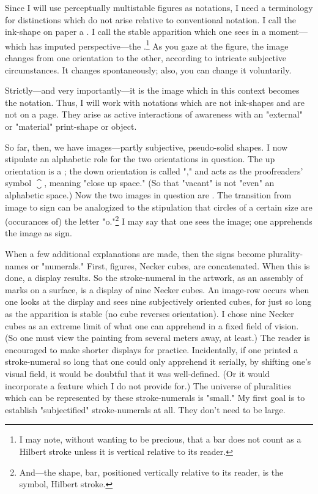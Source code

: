 Since I will use perceptually multistable figures as notations, I 
need a terminology for distinctions which do not arise relative to 
conventional notation. I call the ink-shape on paper a . I call the 
stable apparition which one sees in a moment---which has imputed 
perspective---the .\footnote{I may note, without wanting to be precious, that a bar does not count as a Hilbert stroke unless it is vertical relative to its reader.}
As you gaze at the figure, the image changes 
from one orientation to the other, according to intricate subjective 
circumstances. It changes spontaneously; also, you can change it 
voluntarily. 

Strictly---and very importantly---it is the image which in this 
context becomes the notation. Thus, I will work with notations which 
are not ink-shapes and are not on a page. They arise as active interactions 
of awareness with an "external" or "material" print-shape or 
object. 

So far, then, we have images---partly subjective, pseudo-solid 
shapes. I now stipulate an alphabetic role for the two orientations in 
question. The up orientation is a ; the down orientation is called 
"," and acts as the proofreaders' symbol $\closure$, meaning "close up space." 
(So that "vacant" is not "even" an alphabetic space.) Now the 
two images in question are . The transition from image to sign can 
be analogized to the stipulation that circles of a certain size are (occurances 
of) the letter "o."\footnote{And---the shape, bar, positioned vertically relative to its reader, is the symbol, Hilbert stroke.} I may say that one sees the image; one 
apprehends the image as sign. 

When a few additional explanations are made, then the signs 
become plurality-names or "numerals." First, figures, Necker cubes, 
are concatenated. When this is done, a display results. So the 
stroke-numeral in the artwork, as an assembly of marks on a surface, is a 
display of nine Necker cubes. An image-row occurs when one looks at 
the display and sees nine subjectively oriented cubes, for just so long as 
the apparition is stable (no cube reverses orientation). I chose nine 
Necker cubes as an extreme limit of what one can apprehend in a fixed 
field of vision. (So one must view the painting from several meters 
away, at least.) The reader is encouraged to make shorter displays for 
practice. Incidentally, if one printed a stroke-numeral so long that one 
could only apprehend it serially, by shifting one's visual field, it would 
be doubtful that it was well-defined. (Or it would incorporate a feature 
which I do not provide for.) The universe of pluralities which can be 
represented by these stroke-numerals is "small." My first goal is to 
establish "subjectified" stroke-numerals at all. They don't need to be 
large. 

